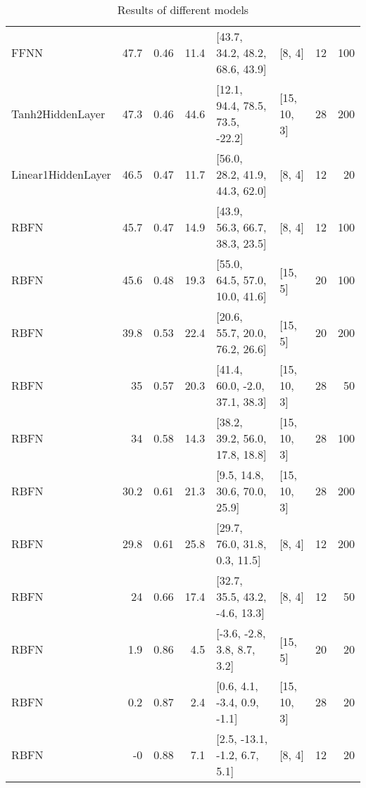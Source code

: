 \begin{table*}
\begin{tabular}{lrrrllrr}
 FFNN               & 47.7 &  0.46 &     11.4 & [43.7, 34.2, 48.2, 68.6, 43.9]  & [8, 4]         &         12 &      100 \\
 Tanh2HiddenLayer   & 47.3 &  0.46 &     44.6 & [12.1, 94.4, 78.5, 73.5, -22.2] & [15, 10, 3]    &         28 &      200 \\
 Linear1HiddenLayer & 46.5 &  0.47 &     11.7 & [56.0, 28.2, 41.9, 44.3, 62.0]  & [8, 4]         &         12 &       20 \\
 RBFN               & 45.7 &  0.47 &     14.9 & [43.9, 56.3, 66.7, 38.3, 23.5]  & [8, 4]         &         12 &      100 \\
 RBFN               & 45.6 &  0.48 &     19.3 & [55.0, 64.5, 57.0, 10.0, 41.6]  & [15, 5]        &         20 &      100 \\
 RBFN               & 39.8 &  0.53 &     22.4 & [20.6, 55.7, 20.0, 76.2, 26.6]  & [15, 5]        &         20 &      200 \\
 RBFN               & 35   &  0.57 &     20.3 & [41.4, 60.0, -2.0, 37.1, 38.3]  & [15, 10, 3]    &         28 &       50 \\
 RBFN               & 34   &  0.58 &     14.3 & [38.2, 39.2, 56.0, 17.8, 18.8]  & [15, 10, 3]    &         28 &      100 \\
 RBFN               & 30.2 &  0.61 &     21.3 & [9.5, 14.8, 30.6, 70.0, 25.9]   & [15, 10, 3]    &         28 &      200 \\
 RBFN               & 29.8 &  0.61 &     25.8 & [29.7, 76.0, 31.8, 0.3, 11.5]   & [8, 4]         &         12 &      200 \\
 RBFN               & 24   &  0.66 &     17.4 & [32.7, 35.5, 43.2, -4.6, 13.3]  & [8, 4]         &         12 &       50 \\
 RBFN               &  1.9 &  0.86 &      4.5 & [-3.6, -2.8, 3.8, 8.7, 3.2]     & [15, 5]        &         20 &       20 \\
 RBFN               &  0.2 &  0.87 &      2.4 & [0.6, 4.1, -3.4, 0.9, -1.1]     & [15, 10, 3]    &         28 &       20 \\
 RBFN               & -0   &  0.88 &      7.1 & [2.5, -13.1, -1.2, 6.7, 5.1]    & [8, 4]         &         12 &       20 \\
\hline
\end{tabular}
            \caption{Results of different models}
            \label{table-models}
        \end{table*}
        
